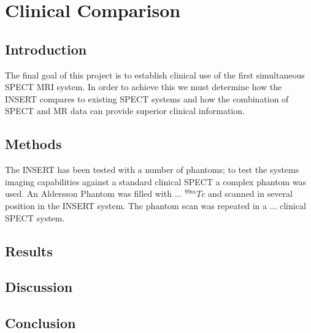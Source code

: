 \chapter{Clinical Comparison}
\label{chapterlabel}


\section{Introduction}
The final goal of this project is to establish clinical use of the first simultaneous \acrshort{SPECT} MRI system. In order to achieve this we must determine how the INSERT compares to existing SPECT systems and how the combination of SPECT and MR data can provide superior clinical information. 
\section{Methods}
The INSERT has been tested with a number of phantoms; to test the systems imaging capabilities against a standard clinical SPECT a complex phantom was used. An Aldersson Phantom was filled with ... $^{99m}Tc$ and scanned in several position in the INSERT system. The phantom scan was repeated in a ... clinical SPECT system.  
\section{Results}

\section{Discussion}

\section{Conclusion}